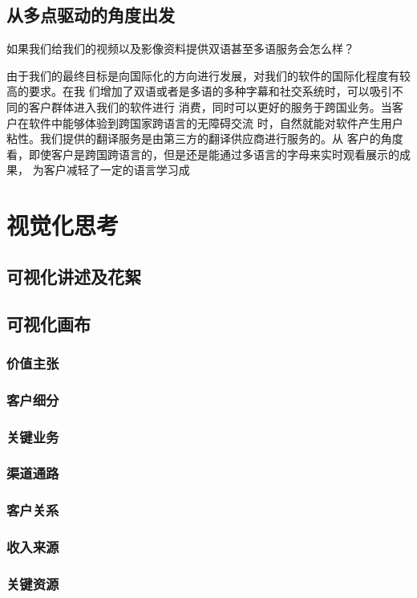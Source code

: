 \documentclass[a4paper,12pt]{article}
\begin{document}
\subsection{从多点驱动的角度出发}
如果我们给我们的视频以及影像资料提供双语甚至多语服务会怎么样？

由于我们的最终目标是向国际化的方向进行发展，对我们的软件的国际化程度有较高的要求。在我 们增加了双语或者是多语的多种字幕和社交系统时，可以吸引不同的客户群体进入我们的软件进行 消费，同时可以更好的服务于跨国业务。当客户在软件中能够体验到跨国家跨语言的无障碍交流 时，自然就能对软件产生用户粘性。我们提供的翻译服务是由第三方的翻译供应商进行服务的。从 客户的角度看，即使客户是跨国跨语言的，但是还是能通过多语言的字母来实时观看展示的成果， 为客户减轻了一定的语言学习成
\section{视觉化思考}
\subsection{可视化讲述及花絮}
\subsection{可视化画布}
\subsubsection{价值主张}
\subsubsection{客户细分}
\subsubsection{关键业务}
\subsubsection{渠道通路}
\subsubsection{客户关系}
\subsubsection{收入来源}
\subsubsection{关键资源}
\end{document}
